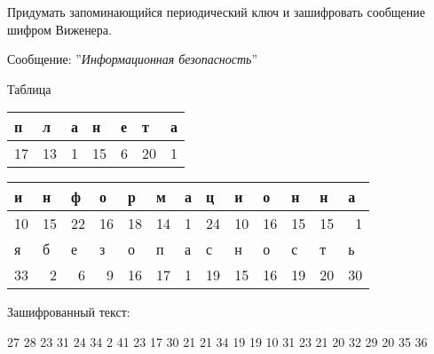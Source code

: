 \begin{problem}
  Придумать запоминающийся периодический ключ и зашифровать сообщение шифром
  Виженера.

  Сообщение: ''\textit{Информационная безопасность}''
\end{problem}

\begin{solution}
  Таблица

  \begin{table}[H]
  \centering
  \begin{tabular}{|l|l|l|l|l|l|l|}
  \hline
  п & л & а & н & е & т & а \\ \hline
  \multicolumn{1}{|r|}{17} & \multicolumn{1}{r|}{13} & \multicolumn{1}{r|}{1} & \multicolumn{1}{r|}{15} & \multicolumn{1}{r|}{6} & \multicolumn{1}{r|}{20} & \multicolumn{1}{r|}{1} \\ \hline
  \end{tabular}
  \label{}
  \end{table}

  \begin{table}[H]
  \centering
  \begin{tabular}{|l|l|l|l|l|l|l|l|l|l|l|l|l|}
  \hline
  и & н & ф & о & р & м & а & ц & и & о & н & н & а \\ \hline
  \multicolumn{1}{|r|}{10} & \multicolumn{1}{r|}{15} & \multicolumn{1}{r|}{22} & \multicolumn{1}{r|}{16} & \multicolumn{1}{r|}{18} & \multicolumn{1}{r|}{14} & \multicolumn{1}{r|}{1} & \multicolumn{1}{r|}{24} & \multicolumn{1}{r|}{10} & \multicolumn{1}{r|}{16} & \multicolumn{1}{r|}{15} & \multicolumn{1}{r|}{15} & \multicolumn{1}{r|}{1} \\ \hline
  я & б & е & з & о & п & а & с & н & о & с & т & ь \\ \hline
  \multicolumn{1}{|r|}{33} & \multicolumn{1}{r|}{2} & \multicolumn{1}{r|}{6} & \multicolumn{1}{r|}{9} & \multicolumn{1}{r|}{16} & \multicolumn{1}{r|}{17} & \multicolumn{1}{r|}{1} & \multicolumn{1}{r|}{19} & \multicolumn{1}{r|}{15} & \multicolumn{1}{r|}{16} & \multicolumn{1}{r|}{19} & \multicolumn{1}{r|}{20} & \multicolumn{1}{r|}{30} \\ \hline
  \end{tabular}
  \label{}
  \end{table}

 
  Зашифрованный текст:
  \begin{addmargin}[2cm]{1cm}
    27 28 23 31 24 34 2 41 23 17 30 21 21 34 19 19 10 31 23 21 20 32 29 20 35
    36
  \end{addmargin}
\end{solution}
